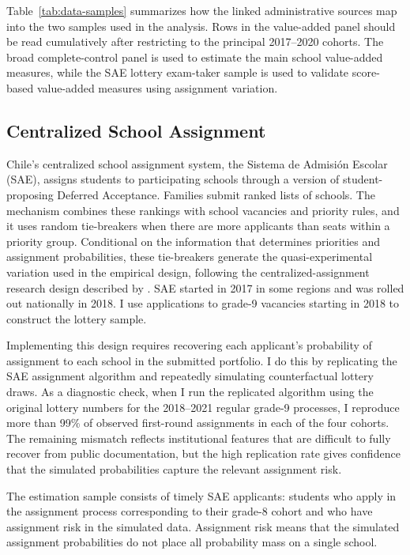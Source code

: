 \documentclass[a4paper, article, english, oneside, unknownkeysallowed, 12pt]{memoir}
\begin{document}
Table~\ref{tab:data-samples} summarizes how the linked administrative sources map into the two samples used in the analysis.
Rows in the value-added panel should be read cumulatively after restricting to the principal 2017--2020 cohorts.
The broad complete-control panel is used to estimate the main school value-added measures, while the SAE lottery exam-taker sample is used to validate score-based value-added measures using assignment variation.

\subsection{Centralized School Assignment}

Chile's centralized school assignment system, the Sistema de Admisi\'on Escolar (SAE), assigns students to participating schools through a version of student-proposing Deferred Acceptance.
Families submit ranked lists of schools.
The mechanism combines these rankings with school vacancies and priority rules, and it uses random tie-breakers when there are more applicants than seats within a priority group.
Conditional on the information that determines priorities and assignment probabilities, these tie-breakers generate the quasi-experimental variation used in the empirical design, following the centralized-assignment research design described by \textcite{abdulkadiroglu_research_2017}.
SAE started in 2017 in some regions and was rolled out nationally in 2018. 
I use applications to grade-9 vacancies starting in 2018 to construct the lottery sample.


Implementing this design requires recovering each applicant's probability of assignment to each school in the submitted portfolio.
I do this by replicating the SAE assignment algorithm and repeatedly simulating counterfactual lottery draws.
As a diagnostic check, when I run the replicated algorithm using the original lottery numbers for the 2018--2021 regular grade-9 processes, I reproduce more than 99\% of observed first-round assignments in each of the four cohorts.
The remaining mismatch reflects institutional features that are difficult to fully recover from public documentation, but the high replication rate gives confidence that the simulated probabilities capture the relevant assignment risk.

The estimation sample consists of timely SAE applicants: students who apply in the assignment process corresponding to their grade-8 cohort and who have assignment risk in the simulated data.
Assignment risk means that the simulated assignment probabilities do not place all probability mass on a single school.
\end{document}
